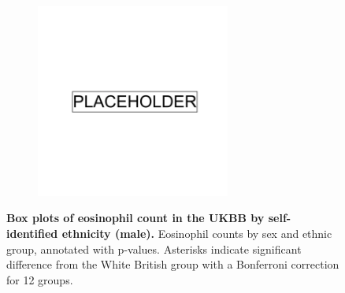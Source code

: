\begin{figure}
    \centering
    \begin{subfigure}{\textwidth}
    \includegraphics[width=0.7\textwidth]{placeholder.png}
    \end{subfigure}
    \caption[Box plots of eosinophil count in the UKBB by self-identified ethnicity (male)]{\textbf{Box plots of eosinophil count in the UKBB by self-identified ethnicity (male).} Eosinophil counts by sex and ethnic group, annotated with p-values. Asterisks indicate significant difference from the White British group with a Bonferroni correction for 12 groups.}
    \label{fig:supp_box_eosinophill_m}
\end{figure}

\newpage


